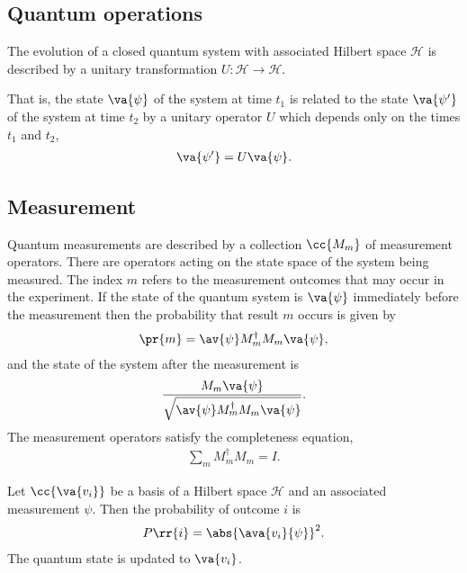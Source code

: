 \documentclass{article}
\begin{document}
\subsection{Quantum operations}
\label{sec:quantum-operations}

\begin{axiom}
  \label{def:quantum-operation}
  The evolution of a closed quantum system with associated Hilbert space $\mathcal H$
  is described by a unitary transformation $U:\mathcal H\to\mathcal H$.

  That is, the state $\va{\psi}$ of the system at time $t_1$ is related to the state
  $\va{\psi'}$ of the system at time $t_2$ by a unitary operator $U$ which depends only
  on the times $t_1$ and $t_2$,
  \begin{align*}
    \va{\psi'}=U\va{\psi}.
  \end{align*}
\end{axiom}

\subsection{Measurement}
\label{sec:measurement}

\begin{axiom}
  Quantum measurements are described by a collection $\cc{M_m}$ of measurement operators.
  There are operators acting on the state space of the system being measured. The index $m$
  refers to the measurement outcomes that may occur in the experiment. If the state of the
  quantum system is $\va{\psi}$ immediately before the measurement then the probability
  that result $m$ occurs is given by
  \begin{align*}
    \pr{m}=\av{\psi}M_m^\dagger M_m \va{\psi},
  \end{align*}
  and the state of the system after the measurement is
  \begin{align*}
    \frac{M_m \va{\psi}}{\sqrt{\av{\psi}M_m^\dagger M_m \va{\psi}}}.
  \end{align*}
  The measurement operators satisfy the completeness equation,
  \begin{align*}
    \sum_{m} M_m^\dagger M_m = I.
  \end{align*}
\end{axiom}

\begin{theorem}
  \label{thm:probability-of-outcome}
  Let $\cc{\va{v_i}}$ be a basis of a Hilbert space $\mathcal{H}$ and an associated measurement $\psi$.
  Then the probability of outcome $i$ is
  \begin{align*}
    P\rr{i} = \abs{\ava{v_i}{\psi}}^2.
  \end{align*}
  The quantum state is updated to $\va{v_i}$.
\end{theorem}
\end{document}
